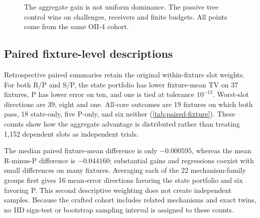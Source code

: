 \begin{figure}[tbp]
\centering
{}
\caption{The aggregate gain is not uniform dominance. The passive tree control wins on challenges, receivers and finite budgets. All points come from the same OII-4 cohort.}
\label{fig:families}
\end{figure}



\subsection{Paired fixture-level descriptions}\label{p3:s01}
Retrospective paired summaries retain the original within-fixture slot weights. For both R/P and S/P, the state portfolio has lower fixture-mean TV on 37 fixtures, P has lower error on ten, and one is tied at tolerance $10^{-12}$. Worst-slot directions are 39, eight and one. All-core outcomes are 19 fixtures on which both pass, 18 state-only, five P-only, and six neither (\cref{tab:paired-fixture}). These counts show how the aggregate advantage is distributed rather than treating 1,152 dependent slots as independent trials.

The median paired fixture-mean difference is only $-0.000595$, whereas the mean R-minus-P difference is $-0.044160$; substantial gains and regressions coexist with small differences on many fixtures. Averaging each of the 22 mechanism-family groups first gives 16 mean-error directions favoring the state portfolio and six favoring P. This second descriptive weighting does not create independent samples. Because the crafted cohort includes related mechanisms and exact twins, no IID sign-test or bootstrap sampling interval is assigned to these counts.

